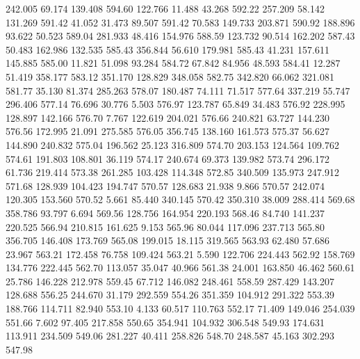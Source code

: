  242.005   69.174  139.408       594.60
 122.766   11.488   43.268       592.22
 257.209   58.142  131.269       591.42
  41.052   31.473   89.507       591.42
  70.583  149.733  203.871       590.92
 188.896   93.622   50.523       589.04
 281.933   48.416  154.976       588.59
 123.732   90.514  162.202       587.43
  50.483  162.986  132.535       585.43
 356.844   56.610  179.981       585.43
  41.231  157.611  145.885       585.00
  11.821   51.098   93.284       584.72
  67.842   84.956   48.593       584.41
  12.287   51.419  358.177       583.12
 351.170  128.829  348.058       582.75
 342.820   66.062  321.081       581.77
  35.130   81.374  285.263       578.07
 180.487   74.111   71.517       577.64
 337.219   55.747  296.406       577.14
  76.696   30.776    5.503       576.97
 123.787   65.849   34.483       576.92
 228.995  128.897  142.166       576.70
   7.767  122.619  204.021       576.66
 240.821   63.727  144.230       576.56
 172.995   21.091  275.585       576.05
 356.745  138.160  161.573       575.37
  56.627  144.890  240.832       575.04
 196.562   25.123  316.809       574.70
 203.153  124.564  109.762       574.61
 191.803  108.801   36.119       574.17
 240.674   69.373  139.982       573.74
 296.172   61.736  219.414       573.38
 261.285  103.428  114.348       572.85
 340.509  135.973  247.912       571.68
 128.939  104.423  194.747       570.57
 128.683   21.938    9.866       570.57
 242.074  120.305  153.560       570.52
   5.661   85.440  340.145       570.42
 350.310   38.009  288.414       569.68
 358.786   93.797    6.694       569.56
 128.756  164.954  220.193       568.46
  84.740  141.237  220.525       566.94
 210.815  161.625    9.153       565.96
  80.044  117.096  237.713       565.80
 356.705  146.408  173.769       565.08
 199.015   18.115  319.565       563.93
  62.480   57.686   23.967       563.21
 172.458   76.758  109.424       563.21
   5.590  122.706  224.443       562.92
 158.769  134.776  222.445       562.70
 113.057   35.047   40.966       561.38
  24.001  163.850   46.462       560.61
  25.786  146.228  212.978       559.45
  67.712  146.082  248.461       558.59
 287.429  143.207  128.688       556.25
 244.670   31.179  292.559       554.26
 351.359  104.912  291.322       553.39
 188.766  114.711   82.940       553.10
   4.133   60.517  110.763       552.17
  71.409  149.046  254.039       551.66
   7.602   97.405  217.858       550.65
 354.941  104.932  306.548       549.93
 174.631  113.911  234.509       549.06
 281.227   40.411  258.826       548.70
 248.587   45.163  302.293       547.98
